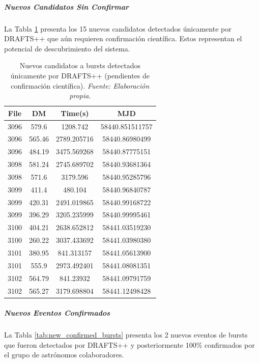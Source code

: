 \subparagraph{Nuevos Candidatos Sin Confirmar}

La Tabla \ref{tab:candidate_bursts} presenta los 15 nuevos candidatos detectados únicamente por DRAFTS++ que aún requieren confirmación científica. Estos representan el potencial de descubrimiento del sistema.

\begin{table}[H]
    \centering
    \caption{Nuevos candidatos a bursts detectados únicamente por DRAFTS++ (pendientes de confirmación científica). \textit{Fuente: Elaboración propia}.}
    \label{tab:candidate_bursts}
    \begin{tabular}{|c|c|c|c|}
        \hline
        \textbf{File} & \textbf{DM} & \textbf{Time(s)} & \textbf{MJD} \\
        \hline
        3096 & 579.6 & 1208.742 & 58440.851511757 \\
        3096 & 565.46 & 2789.205716 & 58440.86980499 \\
        3096 & 484.19 & 3475.569268 & 58440.87775151 \\
        3098 & 581.24 & 2745.689702 & 58440.93681364 \\
        3098 & 571.6 & 3179.596 & 58440.95285796 \\
        3099 & 411.4 & 480.104 & 58440.96840787 \\
        3099 & 420.31 & 2491.019865 & 58440.99168722 \\
        3099 & 396.29 & 3205.235999 & 58440.99995461 \\
        3100 & 404.21 & 2638.652812 & 58441.03519230 \\
        3100 & 260.22 & 3037.433692 & 58441.03980380 \\
        3101 & 380.95 & 841.313157 & 58441.05613900 \\
        3101 & 555.9 & 2973.492401 & 58441.08081351 \\
        3102 & 564.79 & 841.23932 & 58441.09791759 \\
        3102 & 565.27 & 3179.698804 & 58441.12498428 \\
        \hline
    \end{tabular}
\end{table}

\subparagraph{Nuevos Eventos Confirmados}

La Tabla \ref{tab:new_confirmed_bursts} presenta los 2 nuevos eventos de bursts que fueron detectados por DRAFTS++ y posteriormente 100\% confirmados por el grupo de astrónomos colaboradores.

